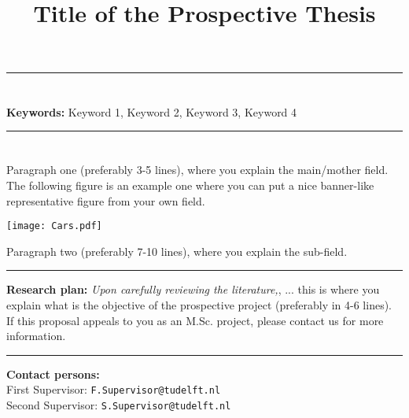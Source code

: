 \documentclass[12pt,a4paper]{article}
\begin{document}
\title{\LARGE \textbf{Title of the Prospective Thesis}}
\date{} 

\vspace{-10mm}


\maketitle
  \vspace{-20mm}
\vspace{-0.5cm}
\textcolor{ColorDef}{\hrule}
\vspace{-0.5cm}
\section*{}
\textbf{Keywords:} Keyword 1, Keyword 2, Keyword 3, Keyword 4
\setlength{\parindent}{0cm}

\vspace{+0.25cm}
\textcolor{ColorDef}{\hrule}
\vspace{-0.5cm}
%
\section*{}
Paragraph one (preferably 3-5 lines), where you explain the main/mother field. The following figure is an example one where you can put a nice banner-like representative figure from your own field.

\vspace{+0.5cm}
\texttt{[image: Cars.pdf]}
\vspace{+0.25cm}

Paragraph two (preferably 7-10 lines), where you explain the sub-field.

\vspace{+0.5cm}
\textcolor{ColorDef}{\hrule}
\vspace{+0.75cm}

\textbf{Research plan:} \emph{Upon carefully reviewing the literature,}, ... this is where you explain what is the objective of the prospective project (preferably in 4-6 lines). \\
 
If this proposal appeals to you as an M.Sc. project, please contact us for more information. 

\vspace{+0.25cm}
\textcolor{ColorDef}{\hrule}
\vspace{+0.5cm}

\textbf{Contact persons:} \\
\hspace*{2ex} First Supervisor: \texttt{F.Supervisor@tudelft.nl}\\
\hspace*{2ex} Second Supervisor: \texttt{S.Supervisor@tudelft.nl} 
\end{document}
